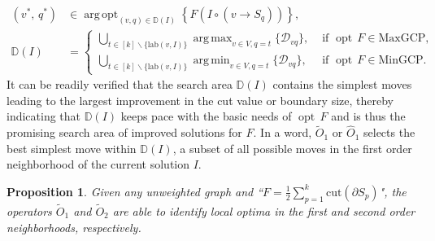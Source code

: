 \documentclass[10pt,a4paper]{amsart}
\newtheorem{prop}{Proposition}
\DeclareMathOperator*{\argmax}{\ensuremath{arg\,max}}
\DeclareMathOperator*{\argmin}{\ensuremath{arg\,min}}
\DeclareMathOperator*{\argopt}{\ensuremath{arg\,opt}}
\newcommand{\cut}{\mathrm{cut}}
\newcommand{\labeling}{\ensuremath{\mathrm{lab}}}
\DeclareMathOperator*{\opt}{\ensuremath{opt}}
\begin{document}
			\begin{align}
				\label{choice::o1cut}
				({v}^*,\,{q}^*)
				&\in 
				\argopt_{(v,q)\in \mathbb{D}(I)}\left\{F(I\circ (v\rightarrow S_q))\right\},
				\\
				\label{eq::d_vq}
				\mathbb{D}(I)
				&=\left\{
				\begin{aligned}
					\bigcup\limits_{t\in [k]\backslash\{\labeling(v, I)\}}\argmax_{v\in V,q=t}\{\mathcal{D}_{vq}\}, & \text{~if~}\opt\, F\in\text{MaxGCP},\\
					\bigcup\limits_{t\in [k]\backslash\{\labeling(v, I)\}}\argmin_{v\in V,q=t}\{\mathcal{D}_{vq}\},  & \text{~if~}\opt\, F\in\text{MinGCP}.
				\end{aligned}
				\right.
			\end{align}
			It can be readily verified that the search area $\mathbb{D}(I)$ contains the simplest moves leading to the largest improvement in the cut value or boundary size, thereby indicating that $\mathbb{D}(I)$ keeps pace with the basic needs of $\opt\,F$ and is thus the promising search area of improved solutions for $F$. In a word, $\widetilde{O}_1$ or $\widehat{O}_1$ selects the best simplest move within $\mathbb{D}(I)$, a subset of all possible moves in the first order neighborhood of the current solution $I$.

			\begin{prop}
				\label{thm::maxkcut}
				Given any unweighted graph and ``$F=\frac{1}{2}\sum_{p=1}^k\cut(\partial S_p)$", the operators $\widetilde{O}_1$ and $\widetilde{O}_2$ are able to identify local optima in the first and second order neighborhoods, respectively.
			\end{prop}
\end{document}
